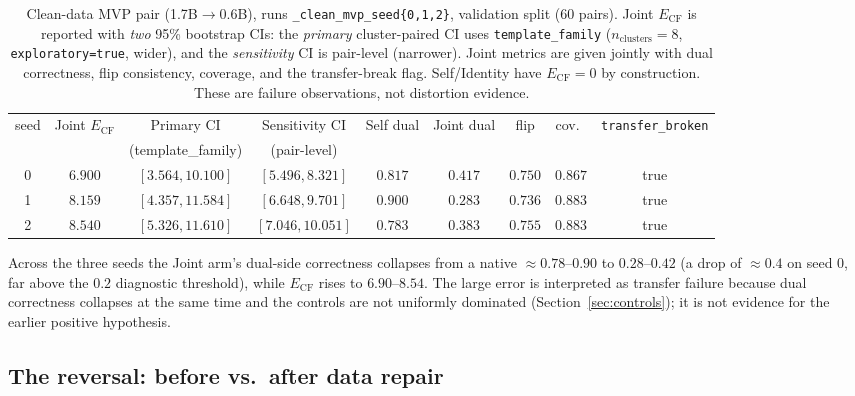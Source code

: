 \documentclass[11pt,a4paper]{article}
\begin{document}
\begin{table}[t]
\centering
\caption{Clean-data MVP pair (1.7B$\to$0.6B), runs
\texttt{\_clean\_mvp\_seed\{0,1,2\}}, validation split (60 pairs). Joint
$E_{\mathrm{CF}}$ is reported with \emph{two} 95\% bootstrap CIs: the
\emph{primary} cluster-paired CI uses \texttt{template\_family}
($n_{\mathrm{clusters}}=8$, \texttt{exploratory=true}, wider), and the
\emph{sensitivity} CI is pair-level (narrower). Joint metrics are given jointly
with dual correctness, flip consistency, coverage, and the transfer-break flag.
Self/Identity have $E_{\mathrm{CF}}=0$ by construction. These are failure
observations, not distortion evidence.}
\label{tab:cleanmvp}
\begin{tabular}{ccccccccc}
\toprule
seed & Joint $E_{\mathrm{CF}}$ & Primary CI & Sensitivity CI & Self dual & Joint dual & flip & cov.\ & \texttt{transfer\_broken} \\
 & & (template\_family) & (pair-level) & & & & & \\
\midrule
0 & $6.900$ & $[3.564,10.100]$ & $[5.496,8.321]$ & $0.817$ & $0.417$ & $0.750$ & $0.867$ & true \\
1 & $8.159$ & $[4.357,11.584]$ & $[6.648,9.701]$ & $0.900$ & $0.283$ & $0.736$ & $0.883$ & true \\
2 & $8.540$ & $[5.326,11.610]$ & $[7.046,10.051]$ & $0.783$ & $0.383$ & $0.755$ & $0.883$ & true \\
\bottomrule
\end{tabular}
\end{table}

Across the three seeds the Joint arm's dual-side correctness collapses from a
native $\approx0.78$--$0.90$ to $0.28$--$0.42$ (a drop of $\approx0.4$ on seed
0, far above the $0.2$ diagnostic threshold), while $E_{\mathrm{CF}}$ rises to
$6.90$--$8.54$. The large error is interpreted as transfer failure because dual
correctness collapses at the same time and the controls are not uniformly
dominated (Section~\ref{sec:controls}); it is not evidence for the earlier
positive hypothesis.

\subsection{The reversal: before vs.\ after data repair}
\label{sec:reversal}
\end{document}
